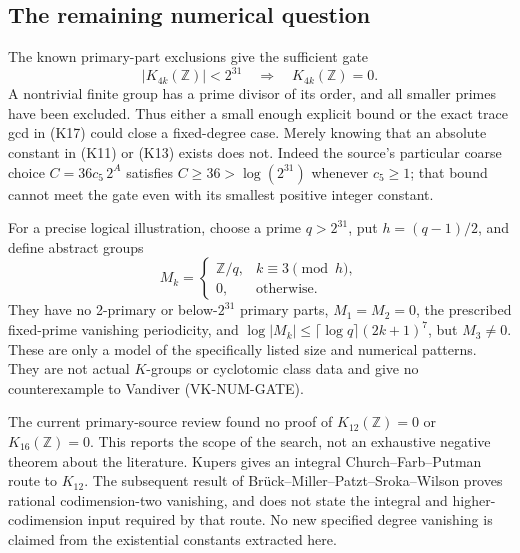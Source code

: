 \subsection{The remaining numerical question}

The known primary-part exclusions give the sufficient gate
\[
 |K_{4k}(\mathbb Z)|<2^{31}
 \quad\Longrightarrow\quad K_{4k}(\mathbb Z)=0.       \tag{K22}
\]
A nontrivial finite group has a prime divisor of its order,
and all smaller primes have been excluded. Thus either a
small enough explicit bound or the exact trace gcd in
(K17) could close a fixed-degree case. Merely knowing that
an absolute constant in (K11) or (K13) exists does not.
Indeed the source's particular coarse choice
\(C=36c_5\,2^A\) satisfies \(C\ge36>\log(2^{31})\)
whenever \(c_5\ge1\); that bound cannot meet the gate even
with its smallest positive integer constant.

For a precise logical illustration, choose a prime
\(q>2^{31}\), put \(h=(q-1)/2\), and define abstract groups
\[
 M_k=
 \begin{cases}
 \mathbb Z/q,& k\equiv3\pmod h,\\
 0,&\text{otherwise}.
 \end{cases}
\]
They have no 2-primary or below-\(2^{31}\) primary parts,
\(M_1=M_2=0\), the prescribed fixed-prime vanishing
periodicity, and
\(\log|M_k|\le\lceil\log q\rceil(2k+1)^7\), but
\(M_3\ne0\). These are only a model of the specifically
listed size and numerical patterns. They are not actual
\(K\)-groups or cyclotomic class data and give no
counterexample to Vandiver (VK-NUM-GATE).

The current primary-source review found no proof of
\(K_{12}(\mathbb Z)=0\) or \(K_{16}(\mathbb Z)=0\).
This reports the scope of the search, not an exhaustive
negative theorem about the literature.
Kupers \cite[Remark~2.6, p.~4]{Kupers2019} gives an
integral Church--Farb--Putman route to \(K_{12}\).
The subsequent result of Br\"uck--Miller--Patzt--Sroka--Wilson
\cite[Theorem~B]{BrueckEtAl2024} proves rational
codimension-two vanishing, and does not state the integral
and higher-codimension input required by that route.
No new specified degree vanishing is claimed from the
existential constants extracted here.
